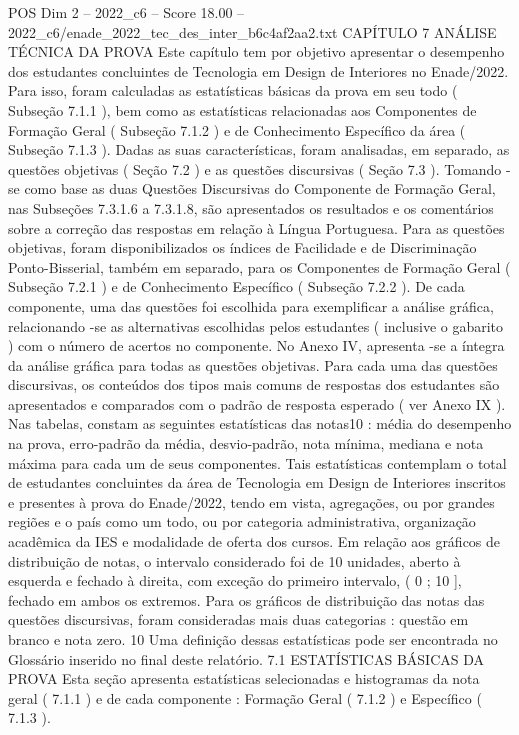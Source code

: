 \begin{textsample}{POS Dim 2 – 2022\_c6 – Score 18.00 – 2022\_c6/enade\_2022\_tec\_des\_inter\_b6c4af2aa2.txt}  \label{ex:f2_pos_131}
CAPÍTULO 7 ANÁLISE TÉCNICA DA PROVA Este capítulo tem por objetivo apresentar o desempenho dos estudantes concluintes de Tecnologia em Design de Interiores no Enade/2022.
Para isso, foram calculadas as estatísticas básicas da prova em seu todo ( Subseção 7.1.1 ), bem como as estatísticas relacionadas aos Componentes de Formação Geral ( Subseção 7.1.2 ) e de Conhecimento Específico da área ( Subseção 7.1.3 ).
Dadas as suas características, foram analisadas, em separado, as questões objetivas ( Seção 7.2 ) e as questões discursivas ( Seção 7.3 ).
Tomando -se como base as duas Questões Discursivas do Componente de Formação Geral, nas Subseções 7.3.1.6 a 7.3.1.8, são apresentados os resultados e os comentários sobre a correção das respostas em relação à Língua Portuguesa.
Para as questões objetivas, foram disponibilizados os índices de Facilidade e de Discriminação Ponto-Bisserial, também em separado, para os Componentes de Formação Geral ( Subseção 7.2.1 ) e de Conhecimento Específico ( Subseção 7.2.2 ).
De cada componente, uma das questões foi escolhida para exemplificar a análise gráfica, relacionando -se as alternativas escolhidas pelos estudantes ( inclusive o gabarito ) com o número de acertos no componente.
No Anexo IV, apresenta -se a íntegra da análise gráfica para todas as questões objetivas.
Para cada uma das questões discursivas, os conteúdos dos tipos mais comuns de respostas dos estudantes são apresentados e comparados com o padrão de resposta esperado ( ver Anexo IX ).
Nas tabelas, constam as seguintes estatísticas das notas10 : média do desempenho na prova, erro-padrão da média, desvio-padrão, nota mínima, mediana e nota máxima para cada um de seus componentes.
Tais estatísticas contemplam o total de estudantes concluintes da área de Tecnologia em Design de Interiores inscritos e presentes à prova do Enade/2022, tendo em vista, agregações, ou por grandes regiões e o país como um todo, ou por categoria administrativa, organização acadêmica da IES e modalidade de oferta dos cursos.
Em relação aos gráficos de distribuição de notas, o intervalo considerado foi de 10 unidades, aberto à esquerda e fechado à direita, com exceção do primeiro intervalo, ( 0 ; 10 ], fechado em ambos os extremos.
Para os gráficos de distribuição das notas das questões discursivas, foram consideradas mais duas categorias : questão em branco e nota zero. 10 Uma definição dessas estatísticas pode ser encontrada no Glossário inserido no final deste relatório. 7.1 ESTATÍSTICAS BÁSICAS DA PROVA Esta seção apresenta estatísticas selecionadas e histogramas da nota geral ( 7.1.1 ) e de cada componente : Formação Geral ( 7.1.2 ) e Específico ( 7.1.3 ).

\end{textsample}
